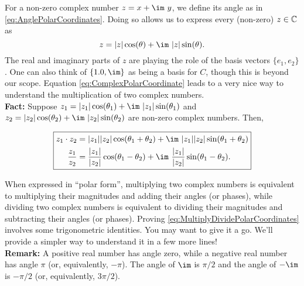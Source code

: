 \vspace*{0.5cm}
\begin{tcolorbox}[sharp corners, colback=green!30, colframe=green!80!blue, title=\textbf{\large Polar Coordinates Meet Complex Numbers and their Multiplication}]
For a non-zero complex number $z = x + \im~y$, we define its angle as in \eqref{eq:AnglePolarCoordinates}. Doing so allows us to express every (non-zero) $z \in \mathbb C$ as
\begin{equation}
    \label{eq:ComplexPolarCoordinate}
z = |z| \cos(\theta) +  \im~|z| \sin(\theta).
\end{equation}
The real and imaginary parts of $z$ are playing the role of the basis vectors $\{e_1, e_2 \}$. One can also think of $\{ 1.0, \im\}$ as being a basis for $C$, though this is beyond our scope. Equation \eqref{eq:ComplexPolarCoordinate} leads to a very nice way to understand the multiplication of two complex numbers.\\

\textbf{Fact:} Suppose $z_1 = |z_1| \cos(\theta_1) +  \im~|z_1| \sin(\theta_1)$ and $z_2 = |z_2| \cos(\theta_2) + \im~ |z_2| \sin(\theta_2)$ are non-zero complex numbers. Then, 

\begin{equation}
    \label{eq:MultiplyDividePolarCoordinates}
   \boxed{\begin{aligned}
    z_1 \cdot z_2&= |z_1| |z_2| \cos(\theta_1 + \theta_2) +  \im~|z_1| |z_2| \sin(\theta_1 + \theta_2)\\
    \frac{z_1}{z_2}&= \frac{|z_1|}{|z_2|} \cos(\theta_1 - \theta_2) + \im~ \frac{|z_1|}{|z_2|}  \sin(\theta_1 -\theta_2). 
    \end{aligned}}
\end{equation}

When expressed in ``polar form'', multiplying two complex numbers is equivalent to multiplying their magnitudes and adding their angles (or phases), while dividing two complex numbers is equivalent to dividing their magnitudes and subtracting their angles (or phases). Proving \eqref{eq:MultiplyDividePolarCoordinates} involves some trigonometric identities. You may want to give it a go. We'll provide a simpler way to understand it in a few more lines!\\

\textbf{Remark:} A positive real number has angle zero, while a negative real number has angle $\pi$ (or, equivalently, $-\pi$). The angle of $\im$ is $\pi/2$ and the angle of $-\im$ is $-\pi/2$ (or, equivalently, $3 \pi/2$).
\end{tcolorbox}

